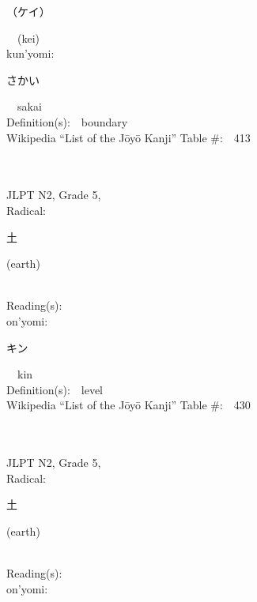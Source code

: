\begin{multicols}{2}
{\hspace*{2em}}{\begin{CJK}{UTF8}{min} （ケイ） \end{CJK}}\ \ (kei)\ \ \\
{\hspace*{1em}}kun'yomi:\ \ \\
{\hspace*{2em}}{\begin{CJK}{UTF8}{min} さかい \end{CJK}}\ \ sakai\ \ \\
Definition(s):\ \ boundary \\
Wikipedia ``List of the J\=oy\=o Kanji'' Table \#:\ \ 413 \\
\ \ \\
{\fontsize{34pt}{40pt}  }\ \ \\  %
{JLPT N2, Grade 5, \\Radical:\ \ {\begin{CJK}{UTF8}{min} 土 \end{CJK}} (earth) } \\
Reading(s):\ \ \\
{\hspace*{1em}}on'yomi:\ \ \\
{\hspace*{2em}}{\begin{CJK}{UTF8}{min} キン \end{CJK}}\ \ kin\ \ \\
Definition(s):\ \ level \\
Wikipedia ``List of the J\=oy\=o Kanji'' Table \#:\ \ 430 \\
\ \ \\
{\fontsize{34pt}{40pt}  }\ \ \\  %
{JLPT N2, Grade 5, \\Radical:\ \ {\begin{CJK}{UTF8}{min} 土 \end{CJK}} (earth) } \\
Reading(s):\ \ \\
{\hspace*{1em}}on'yomi:\ \ \\

\end{multicols}
